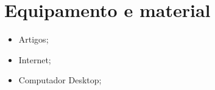 \section{Equipamento e material}
    
\begin{itemize}
    \item Artigos;
    \item Internet;
    \item Computador Desktop;
\end{itemize}
